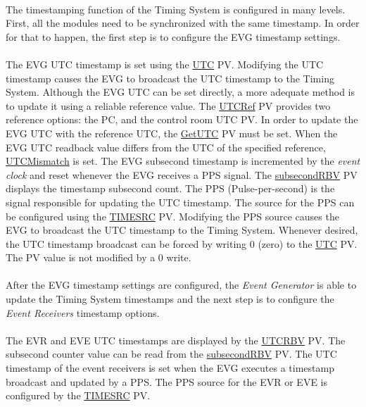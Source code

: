 \documentclass[openany]{article}
\begin{document}
		\paragraph{} The timestamping function of the Timing System is configured in many levels. First, all the modules need to be synchronized with the same timestamp. In order for that to happen, the first step is to configure the EVG timestamp settings.
		\paragraph{} The EVG UTC timestamp is set using the \hyperref[pvgroup:evg-timestamp]{UTC} PV. Modifying the UTC timestamp causes the EVG to broadcast the UTC timestamp to the Timing System. Although the EVG UTC can be set directly, a more adequate method is to update it using a reliable reference value. The \hyperref[pvgroup:evg-timestamp]{UTCRef} PV provides two reference options: the PC, and the control room UTC PV. In order to update the EVG UTC with the reference UTC, the \hyperref[pvgroup:evg-timestamp]{GetUTC} PV must be set. When the EVG UTC readback value differs from the UTC of the specified reference, \hyperref[pvgroup:evg-timestamp]{UTCMismatch} is set. The EVG subsecond timestamp is incremented by the \emph{event clock} and reset whenever the EVG receives a PPS signal. The \hyperref[pvgroup:evg-timestamp]{subsecondRBV} PV displays the timestamp subsecond count. The PPS (Pulse-per-second) is the signal responsible for updating the UTC timestamp. The source for the PPS can be configured using the \hyperref[pvgroup:evg-timestamp]{TIMESRC} PV. Modifying the PPS source causes the EVG to broadcast the UTC timestamp to the Timing System. Whenever desired, the UTC timestamp broadcast can be forced by writing 0 (zero) to the \hyperref[pvgroup:evg-timestamp]{UTC} PV. The PV value is not modified by a 0 write.
		\paragraph{} After the EVG timestamp settings are configured, the \emph{Event Generator} is able to update the Timing System timestamps and the next step is to configure the \emph{Event Receivers} timestamp options.
		\paragraph{} The EVR and EVE UTC timestamps are displayed by the \hyperref[pvgroup:evre-timestamp]{UTCRBV} PV. The subsecond counter value can be read from the \hyperref[pvgroup:evre-timestamp]{subsecondRBV} PV. The UTC timestamp of the event receivers is set when the EVG executes a timestamp broadcast and updated by a PPS. The PPS source for the EVR or EVE is configured by the \hyperref[pvgroup:evre-timestamp]{TIMESRC} PV.
\end{document}
